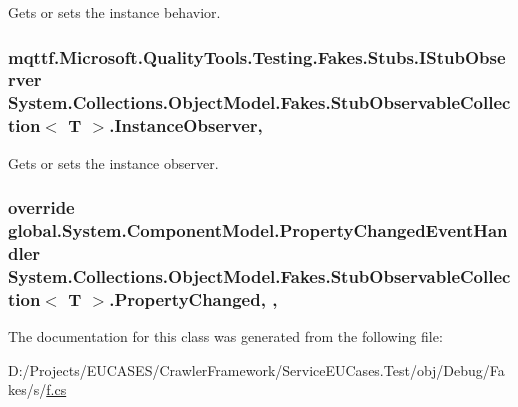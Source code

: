 Gets or sets the instance behavior.

\hypertarget{class_system_1_1_collections_1_1_object_model_1_1_fakes_1_1_stub_observable_collection_3_01_t_01_4_a045ed738bd66a15412e373ce3e5e32e4}{
\subsubsection[{Instance\-Observer}]{\setlength{\rightskip}{0pt plus 5cm}mqttf.\-Microsoft.\-Quality\-Tools.\-Testing.\-Fakes.\-Stubs.\-I\-Stub\-Observer System.\-Collections.\-Object\-Model.\-Fakes.\-Stub\-Observable\-Collection$<$ T $>$.Instance\-Observer\hspace{0.3cm}{\ttfamily [get]}, {\ttfamily [set]}}}\label{class_system_1_1_collections_1_1_object_model_1_1_fakes_1_1_stub_observable_collection_3_01_t_01_4_a045ed738bd66a15412e373ce3e5e32e4}


Gets or sets the instance observer.

\hypertarget{class_system_1_1_collections_1_1_object_model_1_1_fakes_1_1_stub_observable_collection_3_01_t_01_4_aafdc8d23c06e03566caddcb68d5b9416}{
\subsubsection[{Property\-Changed}]{\setlength{\rightskip}{0pt plus 5cm}override global.\-System.\-Component\-Model.\-Property\-Changed\-Event\-Handler System.\-Collections.\-Object\-Model.\-Fakes.\-Stub\-Observable\-Collection$<$ T $>$.Property\-Changed\hspace{0.3cm}{\ttfamily [add]}, {\ttfamily [remove]}, {\ttfamily [protected]}}}\label{class_system_1_1_collections_1_1_object_model_1_1_fakes_1_1_stub_observable_collection_3_01_t_01_4_aafdc8d23c06e03566caddcb68d5b9416}


The documentation for this class was generated from the following file\-:\begin{DoxyCompactItemize}
\item 
D\-:/\-Projects/\-E\-U\-C\-A\-S\-E\-S/\-Crawler\-Framework/\-Service\-E\-U\-Cases.\-Test/obj/\-Debug/\-Fakes/s/\hyperlink{s_2f_8cs}{f.\-cs}\end{DoxyCompactItemize}
